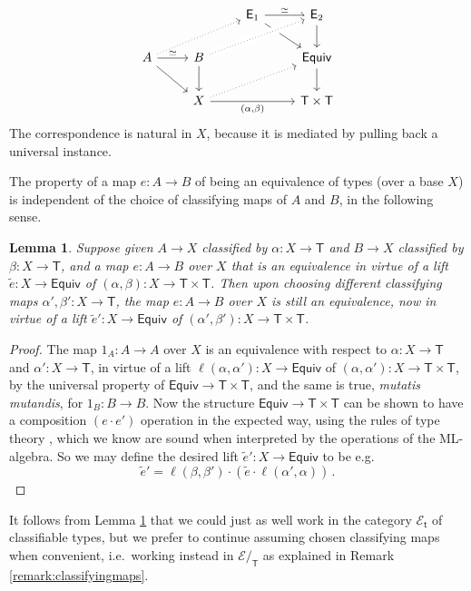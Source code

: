 \documentclass[12pt,reqno]{amsart}
\newcommand{\EE}{\ensuremath{\mathcal{E}}}
\renewcommand{\to}{\ensuremath{\rightarrow}}
\renewcommand{\t}{\ensuremath{\mathsf{t}}}
\newcommand{\T}{\ensuremath{\mathsf{T}}}
\newtheorem{lemma}[theorem]{Lemma}
\theoremstyle{remark}
\theoremstyle{definition}
\begin{document}
\begin{equation}\label{diag:univalence3}
\begin{tikzcd} 
	&& \mathsf{E}_1 \ar[rd]  \ar[r,"{\simeq}"]  & \mathsf{E}_2 \ar[d] \\  
A \ar[rd] \ar[r, "{\simeq}"] \ar[rru, dotted] & B \ar[d] \ar[rru, crossing over, dotted] && \mathsf{Equiv} \ar[d] \\  
& X \ar[rru, dotted] \ar[rr, swap, "{(\alpha, \beta)}"] && \T \times \T
	 \end{tikzcd}
 \end{equation}
The correspondence is natural in $X$, because it is mediated by pulling back a universal instance.  

The property of a map $e : A \to B$ of being an equivalence of types (over a base $X$) is independent of the choice of classifying maps of $A$ and $B$, in the following sense.
\begin{lemma}\label{lemma:equivinvariance}
Suppose given $A\to X$ classified by $\alpha: X \to \T$ and $B \to X$ classified by $\beta: X \to \T$, and a map $e : A \to B$ over $X$ that is an equivalence in virtue of a lift $\tilde{e} : X \to  \mathsf{Equiv}$ of $(\alpha, \beta) : X \to \T\times \T$.   Then upon choosing different classifying maps $\alpha', \beta' : X \to \T$, the map $e : A \to B$ over $X$ is still an equivalence, now in virtue of a lift ${\tilde{e}}' : X \to \mathsf{Equiv}$ of $(\alpha', \beta') : X \to \T\times \T$.
\end{lemma}

\begin{proof}
The map $1_A : A \to A$ over $X$ is an equivalence with respect to $\alpha: X \to \T$ and $\alpha': X \to \T$, in virtue of a lift $\ell(\alpha, \alpha') : X \to\mathsf{Equiv}$ of $(\alpha, \alpha') : X \to \T\times \T$, by the universal property of $\mathsf{Equiv} \to \T\times \T$, and the same is true, \emph{mutatis mutandis}, for  $1_B : B \to B$.  Now the structure $\mathsf{Equiv} \to \T\times \T$ can be shown to have a composition $(e\cdot e')$ operation in the expected way, using the rules of type theory \cite[Theorem 4.7.1]{HoTTbook}, which we know are sound when interpreted by the operations of the ML-algebra.  So we may define the desired lift ${\tilde{e}}' : X \to \mathsf{Equiv}$ to be e.g. $${\tilde{e}}' = \ell(\beta, \beta') \cdot ({\tilde{e}}\cdot\ell(\alpha', \alpha))\,.$$
\end{proof}
%
It follows from Lemma \ref{lemma:equivinvariance} that we could just as well work in the category $\EE_\t$ of classifiable types, but we prefer to continue assuming chosen classifying maps when convenient, i.e.\ working instead in $\EE/_\T$ as explained in Remark \ref{remark:classifyingmaps}.
\end{document}
